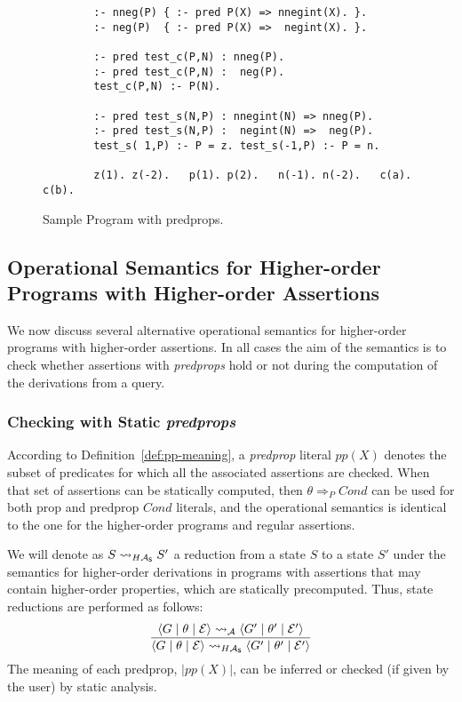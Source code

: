 \documentclass{llncs}
\newcommand{\A}
  {\ensuremath{{\cal A}}}
\newcommand{\gd}[0]{\mid}
\newcommand{\exstate}[3]
  {\ensuremath{\langle #1 \gd{} #2 \gd{} #3 \rangle}}
\newcommand{\ADeps}{\ensuremath{{\cal E}}}
\newcommand{\reductionA}[2]
  {\ensuremath{#1 \leadsto_{\A} #2}}
\newcommand{\reductionHAs}[2]
  {\ensuremath{#1 \leadsto_{H\A_{\textsf{\scriptsize{s}}}}#2}}
\begin{document}
\begin{figure}
\vspace*{-1mm}
  \centering
    \begin{small}
\begin{verbatim}
        :- nneg(P) { :- pred P(X) => nnegint(X). }.
        :- neg(P)  { :- pred P(X) =>  negint(X). }.

        :- pred test_c(P,N) : nneg(P).
        :- pred test_c(P,N) :  neg(P).
        test_c(P,N) :- P(N).

        :- pred test_s(N,P) : nnegint(N) => nneg(P).
        :- pred test_s(N,P) :  negint(N) =>  neg(P).
        test_s( 1,P) :- P = z. test_s(-1,P) :- P = n.

        z(1). z(-2).   p(1). p(2).   n(-1). n(-2).   c(a). c(b).
\end{verbatim}
    \end{small}
  \caption{Sample Program with predprops.}
  \label{ex:pp-calls}
\vspace*{-1mm}
\vspace*{-4mm}
\end{figure}




\subsection{Operational Semantics for  Higher-order Programs with
Higher-order Assertions}
We now discuss several alternative operational semantics for
higher-order programs with higher-order assertions. In all cases the
aim of the semantics is to check whether assertions with
\emph{predprops} hold or not during the computation of the
derivations from a query.



\subsubsection{Checking with Static \emph{predprops}} 
According to Definition~\ref{def:pp-meaning}, a \emph{predprop}
literal $pp(X)$ denotes the subset of predicates for which
all the associated assertions are checked.
When that set of assertions can be statically computed, then $\theta
\Rightarrow_P Cond$ can be used for both prop and predprop $Cond$
literals, and the operational semantics is identical
to the one for the higher-order programs and regular assertions.

We will denote as $\reductionHAs{S}{S'}$ a reduction from a state $S$
to a state $S'$ under the semantics for higher-order derivations in
programs with assertions that may contain higher-order properties,
which are statically precomputed.
Thus, state reductions are performed as follows:
\[
\frac{
  \reductionA{\exstate{G}{\theta}{\ADeps}}
             {\exstate{G'}{\theta'}{\ADeps'}}
}{\reductionHAs{\exstate{G}{\theta}{\ADeps}}
              {\exstate{G'}{\theta'}{\ADeps'}}}
\]
\noindent The meaning of each predprop, $|pp(X)|$, can be inferred or
checked (if given by the user) by static analysis.
\end{document}
